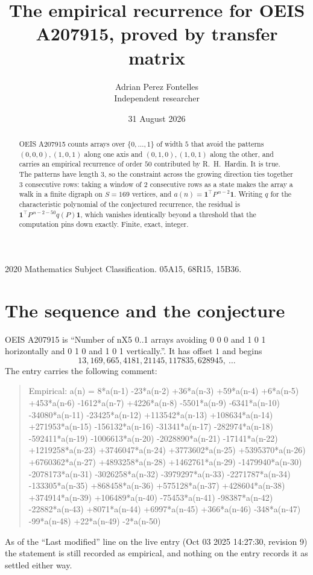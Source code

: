 \documentclass[11pt,a4paper]{article}
\title{The empirical recurrence for OEIS A207915, proved by transfer matrix}
\author{Adrian Perez Fontelles\\ \small Independent researcher}
\date{31 August 2026}
\theoremstyle{plain}
\theoremstyle{definition}
\begin{document}
\maketitle

\begin{abstract}
OEIS A207915 counts arrays over $\{0,\dots,1\}$ of width $5$ that avoid the patterns
$(0,0,0), (1,0,1)$ along one axis and $(0,1,0), (1,0,1)$ along the other, and carries an empirical recurrence of
order $50$ contributed by R.~H.~Hardin. It is true. The patterns have length $3$, so
the constraint across the growing direction ties together $3$ consecutive rows: taking a
window of $2$ consecutive rows as a state makes the array a walk in a finite digraph
on $S=169$ vertices, and $a(n)=\mathbf{1}^{\!\top}P^{\,n-2}\mathbf{1}$. Writing $q$
for the characteristic polynomial of the conjectured recurrence, the residual is
$\mathbf{1}^{\!\top}P^{\,n-2-50}q(P)\mathbf{1}$, which vanishes identically
beyond a threshold that the computation pins down exactly. Finite, exact, integer.
\end{abstract}

\noindent\small 2020 Mathematics Subject Classification. 05A15, 68R15, 15B36.\normalsize

\section{The sequence and the conjecture}

OEIS A207915 is ``Number of nX5 0..1 arrays avoiding 0 0 0 and 1 0 1 horizontally and 0 1 0 and 1 0 1 vertically.''. It has offset
$1$ and begins
\[
13, 169, 665, 4181, 21145, 117835, 628945,\ \dots
\]
The entry carries the following comment:
\begin{quote}\small
Empirical: a(n) = 8*a(n-1) -23*a(n-2) +36*a(n-3) +59*a(n-4) +6*a(n-5) +453*a(n-6) -1612*a(n-7) +4226*a(n-8) -5501*a(n-9) -6341*a(n-10) -34080*a(n-11) -23425*a(n-12) +113542*a(n-13) +108634*a(n-14) +271953*a(n-15) -156132*a(n-16) -31341*a(n-17) -282974*a(n-18) -592411*a(n-19) -1006613*a(n-20) -2028890*a(n-21) -17141*a(n-22) +1219258*a(n-23) +3746047*a(n-24) +3773602*a(n-25) +5395370*a(n-26) +6760362*a(n-27) +4893258*a(n-28) +1462761*a(n-29) -1479940*a(n-30) -2078173*a(n-31) -3026258*a(n-32) -3979297*a(n-33) -2271787*a(n-34) -133305*a(n-35) +868458*a(n-36) +575128*a(n-37) +428604*a(n-38) +374914*a(n-39) +106489*a(n-40) -75453*a(n-41) -98387*a(n-42) -22882*a(n-43) +8071*a(n-44) +6997*a(n-45) +366*a(n-46) -348*a(n-47) -99*a(n-48) +22*a(n-49) -2*a(n-50)
\end{quote}
As of the ``Last modified'' line on the live entry (Oct 03 2025 14:27:30, revision
9) the statement is still recorded as empirical, and nothing on the entry
records it as settled either way.
\end{document}
